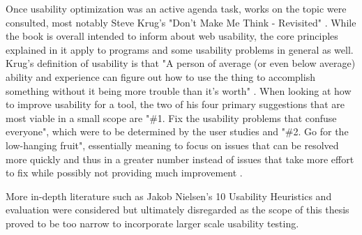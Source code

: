 Once usability optimization was an active agenda task, works on the topic were consulted, most notably Steve Krug's "Don't Make Me Think - Revisited" \cite{DMMThink}. While the book is overall intended to inform about web usability, the core principles explained in it apply to programs and some usability problems in general as well. Krug's definition of usability is that "A person of average (or even below average) ability and experience can figure out how to use the thing to accomplish something without it being more trouble than it's worth" \cite[p.~9]{DMMThink}. When looking at how to improve usability for a tool, the two of his four primary suggestions that are most viable in a small scope are "\#{}1. Fix the usability problems that confuse everyone", which were to be determined by the user studies and "\#{}2. Go for the low-hanging fruit", essentially meaning to focus on issues that can be resolved more quickly and thus in a greater number instead of issues that take more effort to fix while possibly not providing much improvement \cite[p.~178-180]{DMMThink}.

More in-depth literature such as Jakob Nielsen's 10 Usability Heuristics and evaluation \cite{NNG} were considered but ultimately disregarded as the scope of this thesis proved to be too narrow to incorporate larger scale usability testing.